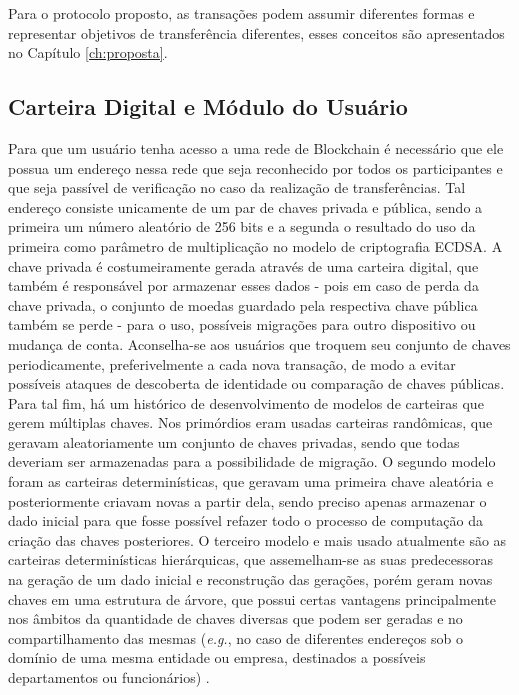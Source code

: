 Para o protocolo proposto, as transações podem assumir diferentes formas e representar objetivos de transferência diferentes, esses conceitos são apresentados no Capítulo \ref{ch:proposta}.

\subsection{Carteira Digital e Módulo do Usuário}
\label{subsec:blockchain:carteira}

Para que um usuário tenha acesso a uma rede  de Blockchain é necessário que ele possua um endereço nessa rede que seja reconhecido por todos os participantes e que seja passível de verificação no caso da realização de transferências. Tal endereço consiste unicamente de um par de chaves privada e pública, sendo a primeira um número aleatório de 256 bits e a segunda o resultado do uso da primeira como parâmetro de multiplicação no modelo de criptografia \ac{ECDSA}. A chave privada é costumeiramente gerada através de uma carteira digital, que também é responsável por armazenar esses dados - pois em caso de perda da chave privada, o conjunto de moedas guardado pela respectiva chave pública também se perde - para o uso, possíveis migrações para outro dispositivo ou mudança de conta. Aconselha-se aos usuários que troquem seu conjunto de chaves periodicamente, preferivelmente a cada nova transação, de modo a evitar possíveis ataques de descoberta de identidade ou comparação de chaves públicas. Para tal fim, há um histórico de desenvolvimento de modelos de carteiras que gerem múltiplas chaves. Nos primórdios eram usadas carteiras randômicas, que geravam aleatoriamente um conjunto de chaves privadas, sendo que todas deveriam ser armazenadas para a possibilidade de migração. O segundo modelo foram as carteiras determinísticas, que geravam uma primeira chave aleatória e posteriormente criavam novas a partir dela, sendo preciso apenas armazenar o dado inicial para que fosse possível refazer todo o processo de computação da criação das chaves posteriores. O terceiro modelo e mais usado atualmente são as carteiras determinísticas hierárquicas, que assemelham-se as suas predecessoras na geração de um dado inicial e reconstrução das gerações, porém geram novas chaves em uma estrutura de árvore, que possui certas vantagens principalmente nos âmbitos da quantidade de chaves diversas que podem ser geradas e no compartilhamento das mesmas (\textit{e.g.}, no caso de diferentes endereços sob o domínio de uma mesma entidade ou empresa, destinados a possíveis departamentos ou funcionários) \cite{blockchain:documentacao_bitcoin}.

